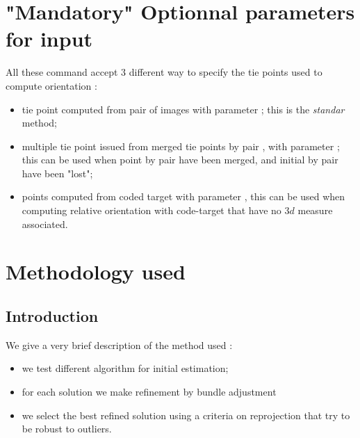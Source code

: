 \documentclass[a4paper]{article}
\begin{document}

\section{"Mandatory" Optionnal parameters for input}

\label{Ref:Mand:Opt:TieP}

All these command accept $3$ different way to specify the tie points used to compute orientation :

\begin{itemize}
   \item  tie point computed from pair of images with parameter ;
	  this is the \emph{standar} method;

   \item  multiple tie point issued from merged tie points by pair , with
          parameter ;
	  this can be  used when point by pair have been merged, and initial 
	  by pair have been "lost";

  \item  points computed from coded target with parameter ,
	 this can be used when computing  relative orientation with code-target
         that have no $3d$ measure associated.
\end{itemize}


\section{Methodology used}


\subsection{Introduction}

We give a very brief description of the method used :

\begin{itemize}
    \item we test different algorithm for initial estimation;
    \item for each solution we make refinement by bundle adjustment
    \item we select the best refined solution  using a criteria on
	    reprojection that try to be robust to outliers.
\end{itemize}
\end{document}
